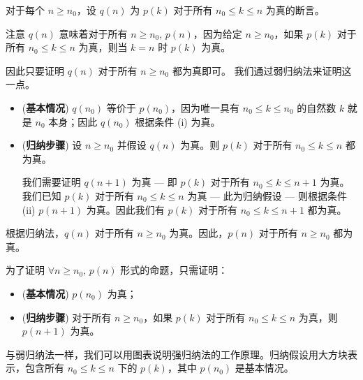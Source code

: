 \begin{cproof}
对于每个 $n \ge n_0$，设 $q(n)$ 为 $p(k)$ 对于所有 $n_0 \le k \le n$ 为真的断言。

注意 $q(n)$ 意味着对于所有 $n \ge n_0$, $p(n)$，因为给定 $n \ge n_0$，如果 $p(k)$ 对于所有 $n_0 \le k \le n$ 为真，则当 $k=n$ 时 $p(k)$ 为真。

因此只要证明 $q(n)$ 对于所有 $n \ge n_0$ 都为真即可。
我们通过弱归纳法来证明这一点。

\begin{itemize}
\item (\textbf{基本情况}) $q(n_0)$ 等价于 $p(n_0)$，因为唯一具有 $n_0 \le k \le n_0$ 的自然数 $k$ 就是 $n_0$ 本身；因此 $q(n_0)$ 根据条件 (i) 为真。

\item (\textbf{归纳步骤}) 设 $n \ge n_0$ 并假设 $q(n)$ 为真。则 $p(k)$ 对于所有 $n_0 \le k \le n$ 都为真。

我们需要证明 $q(n+1)$ 为真 --- 即 $p(k)$ 对于所有 $n_0 \le k \le n+1$ 为真。我们已知 $p(k)$ 对于所有 $n_0 \le k \le n$ 为真 --- 此为归纳假设 --- 则根据条件 (ii) $p(n+1)$ 为真。因此我们有 $p(k)$ 对于所有 $n_0 \le k \le n+1$ 都为真。
\end{itemize}
根据归纳法，$q(n)$ 对于所有 $n \ge n_0$ 为真。因此，$p(n)$ 对于所有 $n \ge n_0$ 都为真。
\end{cproof}

\begin{strategy}[用强归纳法证明]
\label{strStrongInduction}
为了证明 $\forall n \ge n_0,\, p(n)$ 形式的命题，只需证明：
\begin{itemize}
\item (\textbf{基本情况}) $p(n_0)$ 为真；
\item (\textbf{归纳步骤}) 对于所有 $n \ge n_0$，如果 $p(k)$ 对于所有 $n_0 \le k \le n$ 为真，则 $p(n+1)$ 为真。
\end{itemize}
\end{strategy}

与弱归纳法一样，我们可以用图表说明强归纳法的工作原理。归纳假设用大方块表示，包含所有 $n_0 \le k \le n$ 下的 $p(k)$，其中 $p(n_0)$ 是基本情况。

\begin{center}
\end{center}

